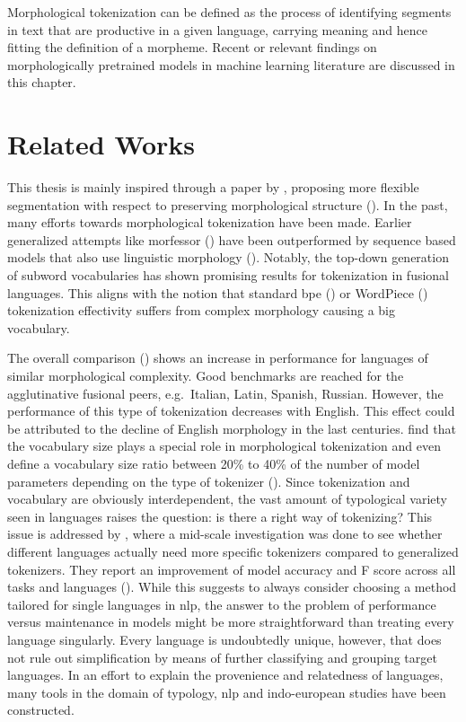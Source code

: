 Morphological tokenization can be defined as the process of identifying segments in text that are productive in a given language, carrying meaning and hence fitting the definition of a morpheme.
Recent or relevant findings on morphologically pretrained models in machine learning literature are discussed in this chapter.

\section{Related Works}
\label{sec:related-works}

This thesis is mainly inspired through a paper by \citeauthor{FLOTA}, proposing more flexible segmentation with respect to preserving morphological structure (\cite{FLOTA}).
In the past, many efforts towards morphological tokenization have been made.
Earlier generalized attempts like morfessor (\cite{morfessor}) have been outperformed by sequence based models that also use linguistic morphology (\cite{subwordvsmorfessor}).
Notably, the top-down generation of subword vocabularies has shown promising results for tokenization in fusional languages.
This aligns with the notion that standard \ac{bpe} (\cite{BPE}) or WordPiece (\cite{WORDPIECEGOOGLE}) tokenization effectivity suffers from complex morphology causing a big vocabulary.

The overall comparison (\cite[134]{subwordvsmorfessor}) shows an increase in performance for languages of similar morphological complexity.
Good benchmarks are reached for the agglutinative fusional peers, e.g.\ Italian, Latin, Spanish, Russian.
However, the performance of this type of tokenization decreases with English.
This effect could be attributed to the decline of English morphology in the last centuries. %
\citeauthor{TOKENIZATIONIMPACT} find that the vocabulary size plays a special role in morphological tokenization and even define a vocabulary size ratio between 20\% to 40\% of the number of model parameters depending on the type of tokenizer (\citeyear[11--12]{TOKENIZATIONIMPACT}).
Since tokenization and vocabulary are obviously interdependent, the vast amount of typological variety seen in languages raises the question: is there a right way of tokenizing?
This issue is addressed by \citeauthor{MONOLINGUAL}, where a mid-scale investigation was done to see whether different languages actually need more specific tokenizers compared to generalized tokenizers.
They report an improvement of model accuracy and F score across all tasks and languages (\cite{MONOLINGUAL}).
While this suggests to always consider choosing a method tailored for single languages in \ac{nlp}, the answer to the problem of performance versus maintenance in models might be more straightforward than treating every language singularly.
Every language is undoubtedly unique, however, that does not rule out simplification by means of further classifying and grouping target languages.
In an effort to explain the provenience and relatedness of languages, many tools in the domain of typology, \ac{nlp} and indo-european studies have been constructed.

